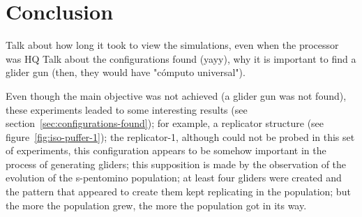 
\section{Conclusion}
Talk about how long it took to view the simulations, even when the processor was HQ
Talk about the configurations found (yayy), why it is important to find a
glider gun (then, they would have "cómputo universal").

Even though the main objective was not achieved (a glider gun was
not found), these experiments leaded to some interesting results
(see section~\ref{sec:configurations-found}); for example, a
replicator structure (see figure~\ref{fig:iso-puffer-1});  the
replicator-1, although could not be probed in this set of
experiments, this configuration appears to be somehow important
in the process of generating gliders; this supposition is made by
the observation of the evolution of the s-pentomino population;
at least four gliders were created and the pattern that appeared
to create them kept replicating in the population; but the more
the population grew, the more the population got in its way.
